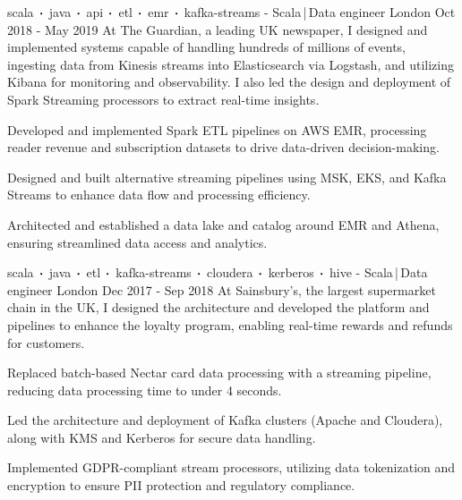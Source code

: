 \begin{cventries}
    \cventry
    {scala$\sqbig$java$\sqbig$api$\sqbig$etl$\sqbig$emr$\sqbig$kafka-streams}
    { - Scala\,|\,Data engineer}
    {London}
    {Oct 2018 - May 2019}
    {At The Guardian, a leading UK newspaper, I designed and implemented systems capable of handling hundreds of millions of events, ingesting data from Kinesis streams into Elasticsearch via Logstash, and utilizing Kibana for monitoring and observability. I also led the design and deployment of Spark Streaming processors to extract real-time insights.}
    {
        \begin{cvitems}
            \item{Developed and implemented Spark ETL pipelines on AWS EMR, processing reader revenue and subscription datasets to drive data-driven decision-making.}
            \item{Designed and built alternative streaming pipelines using MSK, EKS, and Kafka Streams to enhance data flow and processing efficiency.}
            \item{Architected and established a data lake and catalog around EMR and Athena, ensuring streamlined data access and analytics.}
        \end{cvitems}
    }

    \cventry
    {scala$\sqbig$java$\sqbig$etl$\sqbig$kafka-streams$\sqbig$cloudera$\sqbig$kerberos$\sqbig$hive}
    { - Scala\,|\,Data engineer}
    {London}
    {Dec 2017 - Sep 2018}
    {At Sainsbury’s, the largest supermarket chain in the UK, I designed the architecture and developed the platform and pipelines to enhance the loyalty program, enabling real-time rewards and refunds for customers.}
    {
        \begin{cvitems}
            \item{Replaced batch-based Nectar card data processing with a streaming pipeline, reducing data processing time to under 4 seconds.}
            \item{Led the architecture and deployment of Kafka clusters (Apache and Cloudera), along with KMS and Kerberos for secure data handling.}
            \item{Implemented GDPR-compliant stream processors, utilizing data tokenization and encryption to ensure PII protection and regulatory compliance.}
        \end{cvitems}
    }


\end{cventries}

